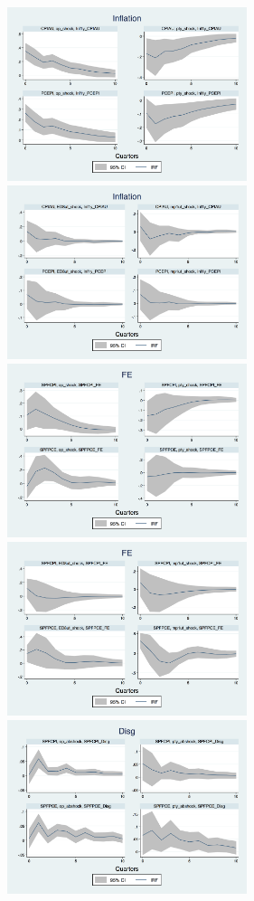 \documentclass[]{article}
\begin{document}
	\begin{figure}[ht]
		\centering
		\includegraphics[width=7cm]{figures/Inf_ashocks_nmp.png}  
		\includegraphics[width=7cm]{figures/Inf_ashocks.png} \\
		\smallskip
		\includegraphics[width=7cm]{figures/SPFFE_ashocks_nmp.png} 
		\includegraphics[width=7cm]{figures/SPFFE_ashocks.png} \\
		\smallskip
		\includegraphics[width=7cm]{figures/SPFDisg_ab_ashocks_nmp.png} 

\end{figure}
\end{document}
